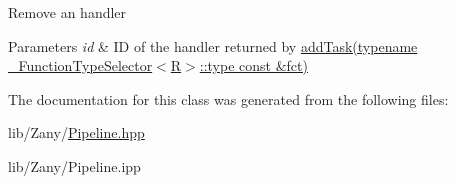 Remove an handler 
\begin{DoxyParams}{Parameters}
{\em id} & ID of the handler returned by \hyperlink{classzany_1_1_pipeline_1_1_set_a1f81cf9f24022822c7c9382de470c07c}{add\+Task(typename \+\_\+\+Function\+Type\+Selector$<$\+R$>$\+::type const \&fct)} \\
\hline
\end{DoxyParams}


The documentation for this class was generated from the following files\+:\begin{DoxyCompactItemize}
\item 
lib/\+Zany/\hyperlink{_pipeline_8hpp}{Pipeline.\+hpp}\item 
lib/\+Zany/Pipeline.\+ipp\end{DoxyCompactItemize}
